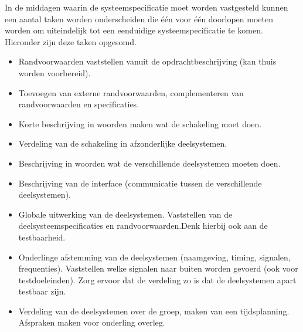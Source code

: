 In de middagen waarin de systeemspecificatie moet worden vastgesteld kunnen
een aantal taken worden onderscheiden die \'e\'en voor \'e\'en doorlopen moeten worden
om uiteindelijk tot een eenduidige systeemspecificatie te komen. Hieronder zijn deze taken opgesomd. 
\begin{itemize}

\item    Randvoorwaarden vaststellen vanuit de opdrachtbeschrijving 
(kan thuis worden voorbereid).
\item    Toevoegen van externe randvoorwaarden, complementeren
          van randvoorwaarden en specificaties.
\item    Korte beschrijving in woorden maken wat de schakeling moet doen.
\item    Verdeling van de schakeling in afzonderlijke deelsystemen.
\item    Beschrijving in woorden wat de verschillende deelsystemen
          moeten doen.
\item    Beschrijving van de interface (communicatie tussen de
          verschillende deelsystemen).
\item    Globale uitwerking van de deelsystemen. Vaststellen van de
          deelsysteemspecificaties en randvoorwaarden.Denk hierbij ook aan
          de testbaarheid.
\item    Onderlinge afstemming van de deelsystemen (naamgeving,
          timing, signalen, frequenties). Vaststellen welke signalen naar
buiten worden gevoerd (ook voor testdoeleinden). Zorg ervoor dat de verdeling zo is dat de deelsystemen apart testbaar zijn.
\item    Verdeling van de deelsystemen over de groep, maken van een
          tijdsplanning. Afspraken maken voor onderling overleg.
\end{itemize}
\cleardoublepage















